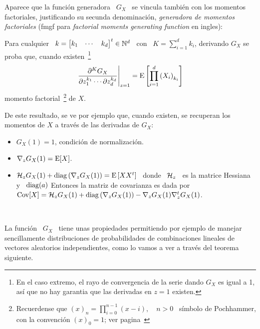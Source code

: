 Aparece  que la  funci\'on generadora  \ $G_X$  \ se  vincula tambi\'en  con los
momentos factoriales, justificando su secunda denominaci\'on, {\em generadora de
  momentos factoriales}  (fmgf para {\em factorial  moments generating function}
en ingles):
%
\begin{lema}
\label{Lem:MP:GeneracionMomentosFactoriales}
%
  Para cualquier \  $k = \begin{bmatrix} k_1 & \cdots  & k_d \end{bmatrix}^t \in
  \mathbb{N}^d$ \ con \ $K =  \sum_{i=1}^d k_i$, derivando $G_X$ se proba que, cuando
  existen~\footnote{En el  caso extremo,  el rayo de  convergencia de  la serie
    dando $G_X$ es igual a 1, as\'i  que no hay garantia que las derivadas en $z
    = 1$ existen.}
  \[
  \left.\frac{\partial^K     G_X}{\partial     z_1^{k_1}     \cdots     \partial
      z_d^{k_d}}\right|_{z=1}    =   \operatorname{E}\left[    \prod_{i=1}^d    \left(   X_i
    \right)_{k_i} \right]
  \]
  momento factorial~\footnote{Recuerdense que  $(x)_n = \prod_{i=0}^{n-1} (x-i),
    \quad n > 0$ \ s\'imbolo de Pochhammer, con la convenci\'on $(x)_0 = 1$; ver
    pagina~\pageref{Foot:MP:Pochhammer}} de $X$.
\end{lema}

De  este resultado,  se ve  por ejemplo  que, cuando  existen, se  recuperan los
momentos de $X$ a trav\'es de las derivadas de $G_X$:
%
\begin{itemize}
\item $G_X(1) = 1$, condici\'on de normalizaci\'on.
%
\item $\nabla_z G_X(1) = \operatorname{E}[X]$.
%
\item $\mathcal{H}_z G_X(1)  + \operatorname{diag}\left( \nabla_z G_X(1) \right)  = \operatorname{E}\left[ X X^t
  \right]$  \  donde  \ $\mathcal{H}_z$  \  es  la  matrice  Hessiana y  \  $\operatorname{diag}(a)$
  Entonces la  matriz de covarianza  es dada por  \ $\operatorname{Cov}[X] = \mathcal{H}_z  G_X(1) +
  \operatorname{diag}\left( \nabla_z G_X(1) \right) - \nabla_z G_X(1) \nabla_z^t G_X(1)$.
\end{itemize}

\

La funci\'on \ $G_X$ \ tiene unas propiedades permitiendo por ejemplo de manejar
sencillamente  distribuciones  de probabilidades  de  combinaciones lineales  de
vectores aleatorios independientes,  como lo vamos a ver  a trav\'es del teorema
siguiente.

